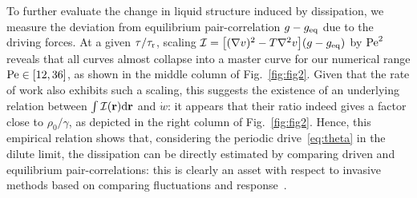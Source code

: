 \documentclass[pre, superscriptaddress, twocolumn,pre]{revtex4-1}
\begin{document}
To further evaluate the change in liquid structure induced by dissipation, we measure the deviation from equilibrium pair-correlation $g-g_{\rm eq}$ due to the driving forces. At a given $\tau/\tau_{\rm r}$, scaling ${\cal I} = \big[(\nabla v)^2-T\nabla^2v\big](g - g_{\rm eq})$ by ${\rm Pe}^2$ reveals that all curves almost collapse into a master curve for our numerical range ${\rm Pe}\in[12,36]$, as shown in the middle column of Fig.~\ref{fig:fig2}. Given that the rate of work also exhibits such a scaling, this suggests the existence of an underlying relation between $\int{\cal I}({\bf r}){\rm d}{\bf r}$ and $\dot w$: it appears that their ratio indeed gives a factor close to $\rho_0/\gamma$, as depicted in the right column of Fig.~\ref{fig:fig2}. Hence, this empirical relation shows that, considering the periodic drive~\eqref{eq:theta} in the dilute limit, the dissipation can be directly estimated by comparing driven and equilibrium pair-correlations: this is clearly an asset with respect to invasive methods based on comparing fluctuations and response~\cite{Harada2005, Harada2006}.
\end{document}
